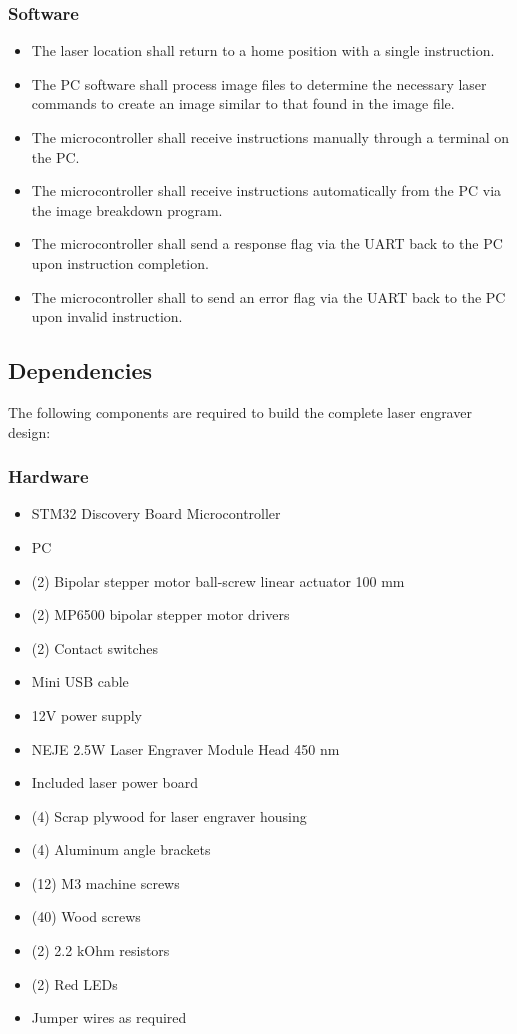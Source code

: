 \documentclass[11pt]{LaTeX-Classes/math-hw}
\begin{document}
\subsubsection*{Software}
	\begin{itemize}
		\item The laser location shall return to a home position with a single instruction.
		\item The PC software shall process image files to determine the necessary laser commands to create an image similar to that found in the image file.
		\item The microcontroller shall receive instructions manually through a terminal on the PC.
		\item The microcontroller shall receive instructions automatically from the PC via the image breakdown program.
		\item The microcontroller shall send a response flag via the UART back to the PC upon instruction completion.
		\item The microcontroller shall to send an error flag via the UART back to the PC upon invalid instruction.
	\end{itemize}

\subsection{Dependencies}
The following components are required to build the complete laser engraver design:
\subsubsection*{Hardware}
\begin{itemize}
	\item STM32 Discovery Board Microcontroller
	\item PC
	\item (2) Bipolar stepper motor ball-screw linear actuator 100 mm
	\item (2) MP6500 bipolar stepper motor drivers
	\item (2) Contact switches
	\item Mini USB cable
	\item 12V power supply
	\item NEJE 2.5W Laser Engraver Module Head 450 nm 
	\item Included laser power board
	\item (4) Scrap plywood for laser engraver housing
	\item (4) Aluminum angle brackets
	\item (12) M3 machine screws
	\item (40) Wood screws
	\item (2) 2.2 kOhm resistors
	\item (2) Red LEDs
	\item Jumper wires as required
\end{itemize}
\end{document}
